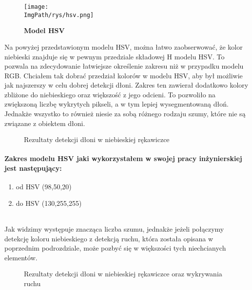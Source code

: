 \documentclass[a4paper,12pt,twoside,openany]{report}
\newcommand{\ImgPath}{.}
\begin{document}
\begin{figure}[H]	
	\centering
	\texttt{[image: \\ImgPath/rys/hsv.png]}
	
	\caption{  \textbf{Model HSV}}
\end{figure}

Na powyżej przedstawionym modelu HSV, można łatwo zaobserwować, że kolor niebieski znajduje się w pewnym przedziale składowej H modelu HSV. To pozwala na zdecydowanie łatwiejsze określenie zakresu niż w przypadku modelu RGB. 
Chciałem tak dobrać przedział kolorów w modelu HSV, aby był możliwie jak najszerszy w celu dobrej detekcji dłoni. Zakres ten zawierał dodatkowo kolory zbliżone do niebieskiego oraz większość z jego odcieni. To pozwoliło na zwiększoną liczbę wykrytych pikseli, a w tym lepiej wysegmentowaną dłoń. Jednakże wszystko to również niesie za sobą różnego rodzaju szumy, które nie są związane z obiektem dłoni. 
\begin{figure}[H]
	\centering
	\caption{Rezultaty detekcji dłoni w niebieskiej rękawiczce}
\end{figure}

\paragraph{Zakres modelu HSV jaki wykorzystałem w swojej pracy inżynierskiej jest następujący:}
\begin{enumerate}
	\item od HSV (98,50,20)
	\item do HSV (130,255,255)
\end{enumerate}
\mbox{} \\

Jak widzimy występuje znacząca liczba szumu, jednakże jeżeli połączymy detekcję koloru niebieskiego z detekcją ruchu, która została opisana w poprzednim podrozdziale, może pozbyć się w większości tych niechcianych elementów. 

\begin{figure}[H]
	\centering
	\caption{Rezultaty detekcji dłoni w niebieskiej rękawiczce oraz wykrywania ruchu}
\end{figure}
\end{document}
